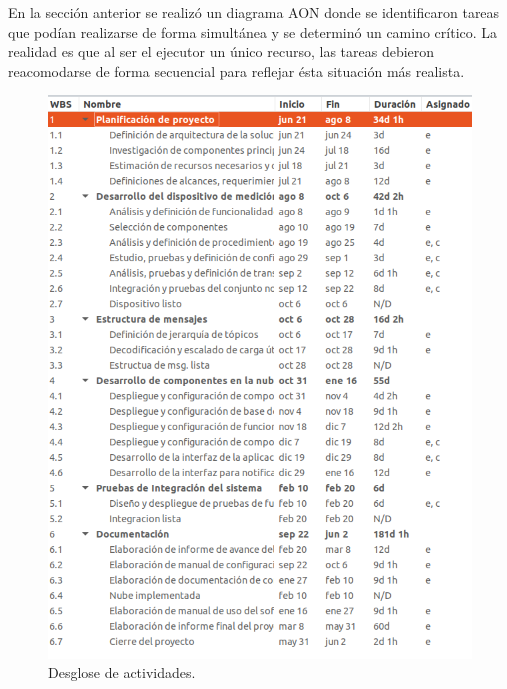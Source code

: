 \documentclass[
11pt, %
]{charter}
\begin{document}
En la sección anterior se realizó un diagrama AON donde se identificaron tareas que podían realizarse de forma simultánea y se determinó un camino crítico. La realidad es que al ser el ejecutor un único recurso, las tareas debieron reacomodarse de forma secuencial para reflejar ésta situación más realista.
\begin{figure}[htpb]
\centering 
\includegraphics[height=.8\textheight]{./Figuras/wbs.png}
\caption{Desglose de actividades.}
\label{fig:diagWBS}
\end{figure}

\end{document}
